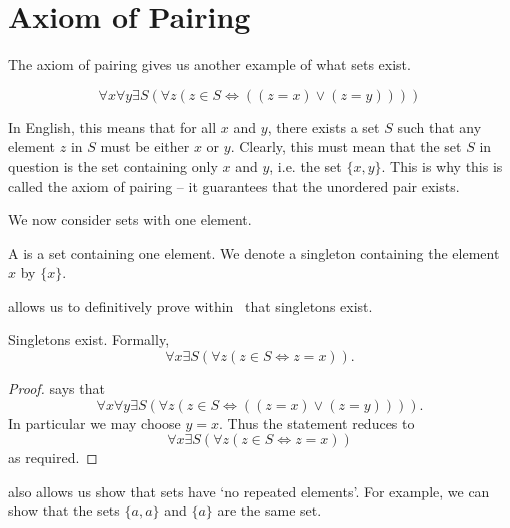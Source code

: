 \section{Axiom of Pairing}
The axiom of pairing gives us another example of what sets exist.

\begin{axiom}[Pairing]\label{axiom:pairing}
    \[
        \forall x \forall y \exists S \left(\forall z \left(z \in S \iff ((z = x) \lor (z = y))\right)\right)
    \]
\end{axiom}

In English, this means that for all $x$ and $y$, there exists a set $S$ such that any element $z$ in $S$ must be either $x$ or $y$. Clearly, this must mean that the set $S$ in question is the set containing only $x$ and $y$, i.e. the set $\{x, y\}$. This is why this is called the axiom of pairing -- it guarantees that the unordered pair exists.

We now consider sets with one element.

\begin{definition}[Singleton]
    A  is a set containing one element. We denote a singleton containing the element $x$ by $\{x\}$.
\end{definition}

 allows us to definitively prove within \ZFC~that singletons exist.

\begin{proposition}\label{prop:singletons-exist}
    Singletons exist. Formally,
    \[
        \forall x \exists S \left(\forall z \left(z \in S \iff z = x\right)\right).
    \]
\end{proposition}
\begin{proof}
     says that
    \[
        \forall x \forall y \exists S \left(\forall z \left(z \in S \iff ((z = x) \lor (z = y))\right)\right).
    \]
    In particular we may choose $y = x$. Thus the statement reduces to
    \[
        \forall x \exists S \left(\forall z \left(z \in S \iff z = x\right)\right)
    \]
    as required.
\end{proof}

 also allows us show that sets have `no repeated elements'. For example, we can show that the sets $\{a, a\}$ and $\{a\}$ are the same set.

